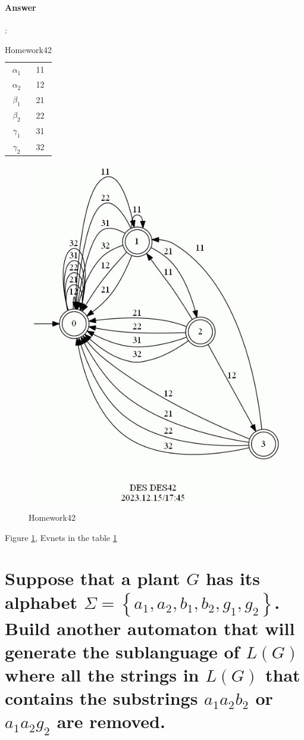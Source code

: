 \documentclass{article}
\begin{document}
\paragraph{Answer}:


\begin{table}
  \centering
  \begin{tabular}{|c|c|}
    $\alpha_1$ & 11\\
    $\alpha_2$ & 12\\
    \hline
    $\beta_1$ & 21\\
    $\beta_2$ & 22\\
    \hline
    $\gamma_1$ & 31\\
    $\gamma_2$ & 32\\
  \end{tabular}
  \caption{Homework42}
  \label{tab:des42}
\end{table}

\begin{figure}
  \centering
  \includegraphics[width=0.6\linewidth]{assets/DES42.jpg}
  \caption{Homework42}
  \label{fig:des42}
\end{figure}

Figure \ref{fig:des42}, Evnets in the table \ref{tab:des42}

\section{Suppose that a plant $G$ has its alphabet $\Sigma=\left\{a_1, a_2, b_1, b_2, g_1, g_2\right\}$. Build another automaton that will generate the sublanguage of $L(G)$ where all the strings in $L(G)$ that contains the substrings $a_1 a_2 b_2$ or $a_1 a_2 g_2$ are removed.}
\end{document}
